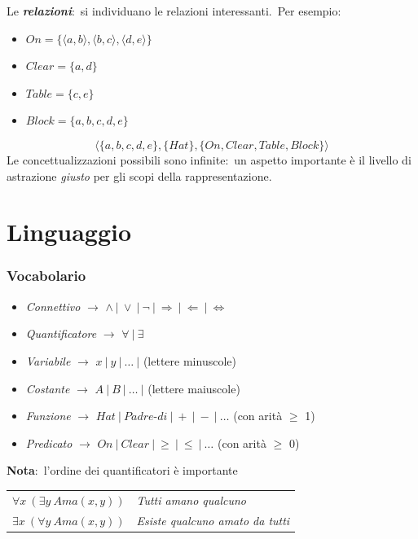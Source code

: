 \noindent Le \textbf{\textit{relazioni}}:\ si individuano le relazioni interessanti.\ Per esempio:
\begin{itemize}
	\item $On = \{\langle a, b\rangle, \langle b, c\rangle, \langle d, e \rangle\}$
	\item $Clear= \{a, d\}$
	\item $Table= \{c, e\}$
	\item $Block= \{a, b, c, d, e\}$
\end{itemize}

\[
	\langle \{a, b, c, d, e\}, \{Hat\}, \{On, Clear, Table, Block\} \rangle
\]
Le concettualizzazioni possibili sono infinite:\ un aspetto importante è il livello di astrazione \textit{giusto} per gli scopi della rappresentazione.

\section{Linguaggio}

\subsubsection{Vocabolario}
\begin{itemize}
	\item \textit{Connettivo} $\rightarrow$ $\land\ |\ \lor\ |\ \lnot\ |\ \Rightarrow\ |\ \Leftarrow\ |\ \Leftrightarrow $
	\item \textit{Quantificatore} $\rightarrow$ $\forall\ |\ \exists$
	\item \textit{Variabile} $\rightarrow$ $x\ |\ y\ |\ \dots\ |$ (lettere minuscole)
	\item \textit{Costante} $\rightarrow$ $ A\ |\ B\ |\ \dots\ |$ (lettere maiuscole)
	\item \textit{Funzione} $\rightarrow$ $Hat\ |\ Padre\textrm{-}di\ |\ +\ |\ -\ |\ \dots$ \qquad (con arità $\geq$ 1)
	\item \textit{Predicato} $\rightarrow$ $On\ |\ Clear\ |\ \geq\ |\ \leq\ |\ \dots$ \qquad (con arità $\geq$ 0)
\end{itemize}

\noindent \textbf{Nota}:\ l'ordine dei quantificatori è importante

\begin{table}[H]
	\centering
	\begin{tabular}{l l}
		$\forall x\ (\exists y\ Ama(x,y))$ & \textit{Tutti amano qualcuno}           \\
		$\exists x\ (\forall y\ Ama(x,y))$ & \textit{Esiste qualcuno amato da tutti} \\
	\end{tabular}
\end{table}

